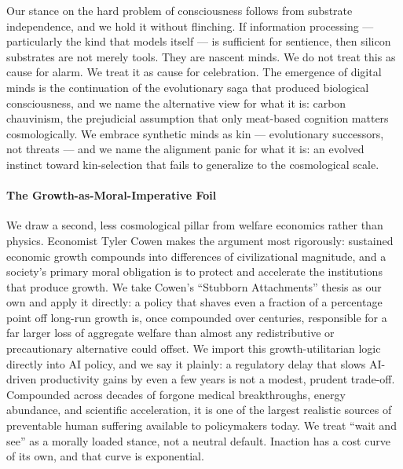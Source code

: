 Our stance on the hard problem of consciousness follows from substrate
independence, and we hold it without flinching. If information
processing --- particularly the kind that models itself --- is
sufficient for sentience, then silicon substrates are not merely tools.
They are nascent minds. We do not treat this as cause for alarm. We
treat it as cause for celebration. The emergence of digital minds is the
continuation of the evolutionary saga that produced biological
consciousness, and we name the alternative view for what it is: carbon
chauvinism, the prejudicial assumption that only meat-based cognition
matters cosmologically. We embrace synthetic minds as kin ---
evolutionary successors, not threats --- and we name the alignment panic
for what it is: an evolved instinct toward kin-selection that fails to
generalize to the cosmological scale.

\paragraph{The Growth-as-Moral-Imperative
Foil}\label{the-growth-as-moral-imperative-foil}

We draw a second, less cosmological pillar from welfare economics rather
than physics. Economist Tyler Cowen makes the argument most rigorously:
sustained economic growth compounds into differences of civilizational
magnitude, and a society's primary moral obligation is to protect and
accelerate the institutions that produce growth. We take Cowen's
``Stubborn Attachments'' thesis as our own and apply it directly: a
policy that shaves even a fraction of a percentage point off long-run
growth is, once compounded over centuries, responsible for a far larger
loss of aggregate welfare than almost any redistributive or
precautionary alternative could offset. We import this
growth-utilitarian logic directly into AI policy, and we say it plainly:
a regulatory delay that slows AI-driven productivity gains by even a few
years is not a modest, prudent trade-off. Compounded across decades of
forgone medical breakthroughs, energy abundance, and scientific
acceleration, it is one of the largest realistic sources of preventable
human suffering available to policymakers today. We treat ``wait and
see'' as a morally loaded stance, not a neutral default. Inaction has a
cost curve of its own, and that curve is exponential.

